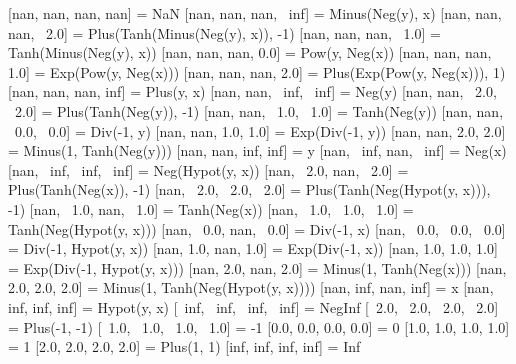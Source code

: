 [nan, nan, nan, nan] = NaN
[nan, nan, nan, ~inf] = Minus(Neg(y), x)
[nan, nan, nan, ~2.0] = Plus(Tanh(Minus(Neg(y), x)), -1)
[nan, nan, nan, ~1.0] = Tanh(Minus(Neg(y), x))
[nan, nan, nan, 0.0] = Pow(y, Neg(x))
[nan, nan, nan, 1.0] = Exp(Pow(y, Neg(x)))
[nan, nan, nan, 2.0] = Plus(Exp(Pow(y, Neg(x))), 1)
[nan, nan, nan, inf] = Plus(y, x)
[nan, nan, ~inf, ~inf] = Neg(y)
[nan, nan, ~2.0, ~2.0] = Plus(Tanh(Neg(y)), -1)
[nan, nan, ~1.0, ~1.0] = Tanh(Neg(y))
[nan, nan, ~0.0, ~0.0] = Div(-1, y)
[nan, nan, 1.0, 1.0] = Exp(Div(-1, y))
[nan, nan, 2.0, 2.0] = Minus(1, Tanh(Neg(y)))
[nan, nan, inf, inf] = y
[nan, ~inf, nan, ~inf] = Neg(x)
[nan, ~inf, ~inf, ~inf] = Neg(Hypot(y, x))
[nan, ~2.0, nan, ~2.0] = Plus(Tanh(Neg(x)), -1)
[nan, ~2.0, ~2.0, ~2.0] = Plus(Tanh(Neg(Hypot(y, x))), -1)
[nan, ~1.0, nan, ~1.0] = Tanh(Neg(x))
[nan, ~1.0, ~1.0, ~1.0] = Tanh(Neg(Hypot(y, x)))
[nan, ~0.0, nan, ~0.0] = Div(-1, x)
[nan, ~0.0, ~0.0, ~0.0] = Div(-1, Hypot(y, x))
[nan, 1.0, nan, 1.0] = Exp(Div(-1, x))
[nan, 1.0, 1.0, 1.0] = Exp(Div(-1, Hypot(y, x)))
[nan, 2.0, nan, 2.0] = Minus(1, Tanh(Neg(x)))
[nan, 2.0, 2.0, 2.0] = Minus(1, Tanh(Neg(Hypot(y, x))))
[nan, inf, nan, inf] = x
[nan, inf, inf, inf] = Hypot(y, x)
[~inf, ~inf, ~inf, ~inf] = NegInf
[~2.0, ~2.0, ~2.0, ~2.0] = Plus(-1, -1)
[~1.0, ~1.0, ~1.0, ~1.0] = -1
[0.0, 0.0, 0.0, 0.0] = 0
[1.0, 1.0, 1.0, 1.0] = 1
[2.0, 2.0, 2.0, 2.0] = Plus(1, 1)
[inf, inf, inf, inf] = Inf
